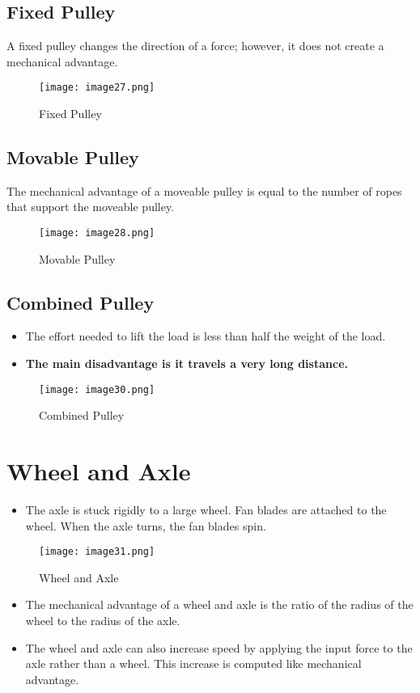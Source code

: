 \documentclass{article}
\begin{document}
\subsection{Fixed Pulley}
A fixed pulley changes the direction of a force; however, it does not create a mechanical advantage. 
\begin{figure}[htp]
    \centering
    \texttt{[image: image27.png]}
    \caption{Fixed Pulley}
\end{figure}
\subsection{Movable Pulley}
The mechanical advantage of a moveable pulley is equal to the number of ropes that support the moveable pulley. 
\begin{figure}[H]
    \centering
    \texttt{[image: image28.png]}
    \caption{Movable Pulley}
\end{figure}
\subsection{Combined Pulley}
\begin{itemize}
    \item The effort needed to lift the load is less than half the weight of the load.
    \item \textbf{The main disadvantage is it travels a very long distance.}
\end{itemize}
\begin{figure}[H]
    \centering
    \texttt{[image: image30.png]}
    \caption{Combined Pulley}
\end{figure}
\section{Wheel and Axle}
\begin{itemize}
    \item The axle is stuck rigidly to a large wheel. Fan blades are attached to the wheel. When the axle turns, the fan blades spin. 
\end{itemize}
\begin{figure}[H]
    \centering
    \texttt{[image: image31.png]}
    \caption{Wheel and Axle}
\end{figure}
\begin{itemize}
    \item The mechanical advantage of a wheel and axle is the ratio of the radius of the wheel to the radius of the axle.
    \item The wheel and axle can also increase speed by applying the input force to the axle rather than a wheel. This increase is computed like mechanical advantage.
\end{itemize}
\end{document}
